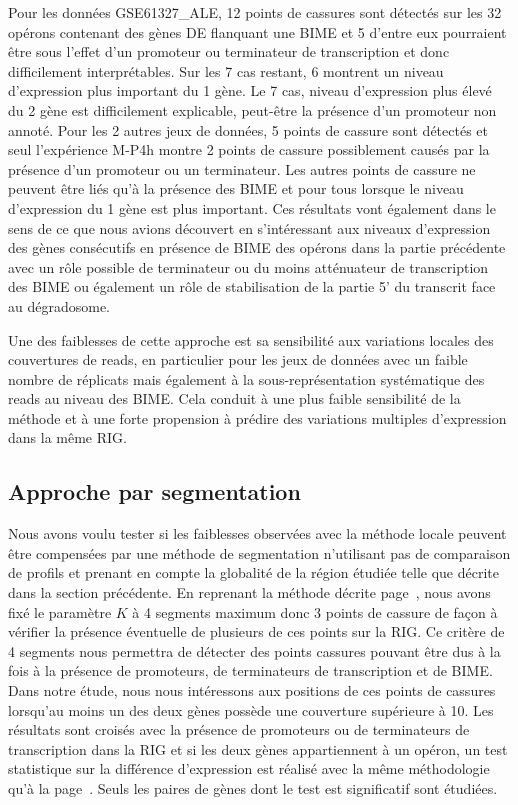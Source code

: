\documentclass[12pt,a4paper]{report}
\begin{document}
\begin{onehalfspace}
Pour les données GSE61327\_ALE, 12 points de cassures sont détectés sur les 32 opérons contenant des gènes DE flanquant une BIME et 5 d'entre eux pourraient être sous l'effet d'un promoteur ou terminateur de transcription et donc difficilement interprétables. Sur les 7 cas restant, 6 montrent un niveau d'expression plus important du 1 gène. Le 7 cas, niveau d'expression plus élevé du 2 gène est difficilement explicable, peut-être la présence d'un promoteur non annoté. Pour les 2 autres jeux de données, 5 points de cassure sont détectés et seul l'expérience M-P4h montre 2 points de cassure possiblement causés par la présence d'un promoteur ou un terminateur. Les autres points de cassure ne peuvent être liés qu'à la présence des BIME et pour tous lorsque le niveau d'expression du 1 gène est plus important.
Ces résultats vont également dans le sens de ce que nous avions découvert en s'intéressant aux niveaux d'expression des gènes consécutifs en présence de BIME des opérons dans la partie précédente avec un rôle possible de terminateur ou du moins atténuateur de transcription des BIME ou également un rôle de stabilisation de la partie 5' du transcrit face au dégradosome.

Une des faiblesses de cette approche est sa sensibilité aux variations locales des couvertures de reads, en particulier pour les jeux de données avec un faible nombre de réplicats mais également à la sous-représentation systématique des reads au niveau des BIME. Cela conduit à une plus faible sensibilité de la méthode et à une forte propension à prédire des variations multiples d’expression dans la même RIG.

\subsection*{Approche par segmentation}

Nous avons voulu tester si les faiblesses observées avec la méthode locale peuvent être compensées par une méthode de segmentation n'utilisant pas de comparaison de profils et prenant en compte la globalité de la région étudiée telle que décrite dans la section précédente.
En reprenant la méthode décrite page~\pageref{methode_segmentation}, nous avons fixé le paramètre $K$ à 4 segments maximum donc 3 points de cassure de façon à vérifier la présence éventuelle de plusieurs de ces points sur la RIG. Ce critère de 4 segments nous permettra de détecter des points cassures pouvant être dus à la fois à la présence de promoteurs, de terminateurs de transcription et de BIME. 
Dans notre étude, nous nous intéressons aux positions de ces points de cassures lorsqu'au moins un des deux gènes possède une couverture supérieure à 10. Les résultats sont croisés avec la présence de promoteurs ou de terminateurs de transcription dans la RIG et si les deux gènes appartiennent à un opéron, un test  statistique sur la différence d'expression est réalisé avec la même méthodologie qu'à la page~\pageref{expression_operon}. Seuls les paires de gènes dont le test est significatif sont étudiées.


\end{onehalfspace}
\end{document}
